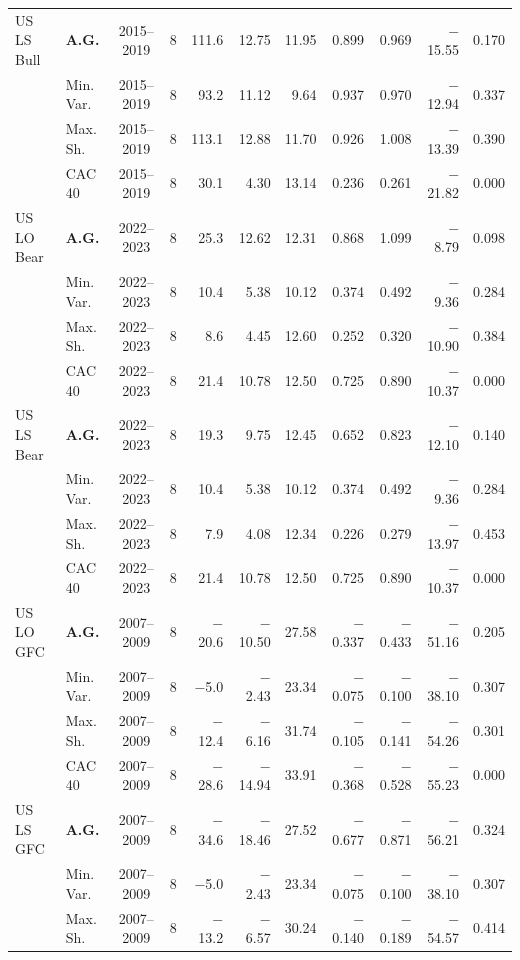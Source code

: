 \begin{longtable}{p{2.6cm} l c c r r r r r r r}
\midrule
US LS Bull & \textbf{A.G.} & 2015--2019 & 8 & 111.6 & 12.75 & 11.95 & 0.899 & 0.969 & $-$15.55 & 0.170 \\
 & Min.\,Var. & 2015--2019 & 8 & 93.2 & 11.12 & 9.64 & 0.937 & 0.970 & $-$12.94 & 0.337 \\
 & Max.\,Sh. & 2015--2019 & 8 & 113.1 & 12.88 & 11.70 & 0.926 & 1.008 & $-$13.39 & 0.390 \\
 & CAC 40 & 2015--2019 & 8 & 30.1 & 4.30 & 13.14 & 0.236 & 0.261 & $-$21.82 & 0.000 \\
\midrule
US LO Bear & \textbf{A.G.} & 2022--2023 & 8 & 25.3 & 12.62 & 12.31 & 0.868 & 1.099 & $-$8.79 & 0.098 \\
 & Min.\,Var. & 2022--2023 & 8 & 10.4 & 5.38 & 10.12 & 0.374 & 0.492 & $-$9.36 & 0.284 \\
 & Max.\,Sh. & 2022--2023 & 8 & 8.6 & 4.45 & 12.60 & 0.252 & 0.320 & $-$10.90 & 0.384 \\
 & CAC 40 & 2022--2023 & 8 & 21.4 & 10.78 & 12.50 & 0.725 & 0.890 & $-$10.37 & 0.000 \\
\midrule
US LS Bear & \textbf{A.G.} & 2022--2023 & 8 & 19.3 & 9.75 & 12.45 & 0.652 & 0.823 & $-$12.10 & 0.140 \\
 & Min.\,Var. & 2022--2023 & 8 & 10.4 & 5.38 & 10.12 & 0.374 & 0.492 & $-$9.36 & 0.284 \\
 & Max.\,Sh. & 2022--2023 & 8 & 7.9 & 4.08 & 12.34 & 0.226 & 0.279 & $-$13.97 & 0.453 \\
 & CAC 40 & 2022--2023 & 8 & 21.4 & 10.78 & 12.50 & 0.725 & 0.890 & $-$10.37 & 0.000 \\
\midrule
US LO GFC & \textbf{A.G.} & 2007--2009 & 8 & $-$20.6 & $-$10.50 & 27.58 & $-$0.337 & $-$0.433 & $-$51.16 & 0.205 \\
 & Min.\,Var. & 2007--2009 & 8 & $-$5.0 & $-$2.43 & 23.34 & $-$0.075 & $-$0.100 & $-$38.10 & 0.307 \\
 & Max.\,Sh. & 2007--2009 & 8 & $-$12.4 & $-$6.16 & 31.74 & $-$0.105 & $-$0.141 & $-$54.26 & 0.301 \\
 & CAC 40 & 2007--2009 & 8 & $-$28.6 & $-$14.94 & 33.91 & $-$0.368 & $-$0.528 & $-$55.23 & 0.000 \\
\midrule
US LS GFC & \textbf{A.G.} & 2007--2009 & 8 & $-$34.6 & $-$18.46 & 27.52 & $-$0.677 & $-$0.871 & $-$56.21 & 0.324 \\
 & Min.\,Var. & 2007--2009 & 8 & $-$5.0 & $-$2.43 & 23.34 & $-$0.075 & $-$0.100 & $-$38.10 & 0.307 \\
 & Max.\,Sh. & 2007--2009 & 8 & $-$13.2 & $-$6.57 & 30.24 & $-$0.140 & $-$0.189 & $-$54.57 & 0.414 \\

\end{longtable}
